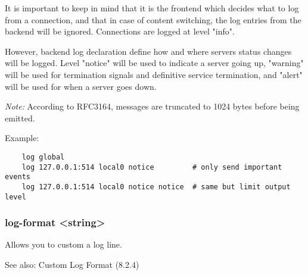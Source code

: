 
  It is important to keep in mind that it is the frontend which decides what to
  log from a connection, and that in case of content switching, the log entries
  from the backend will be ignored. Connections are logged at level "info".

  However, backend log declaration define how and where servers status changes
  will be logged. Level "notice" will be used to indicate a server going up,
  "warning" will be used for termination signals and definitive service
  termination, and "alert" will be used for when a server goes down.

  \emph{Note:} According to RFC3164, messages are truncated to 1024 bytes before
         being emitted.

  Example:

\begin{verbatim}
    log global
    log 127.0.0.1:514 local0 notice         # only send important events
    log 127.0.0.1:514 local0 notice notice  # same but limit output level
\end{verbatim}

\subsubsection[log-format]{log-format <string>}
   Allows you to custom a log line.

   See also: Custom Log Format (8.2.4)

